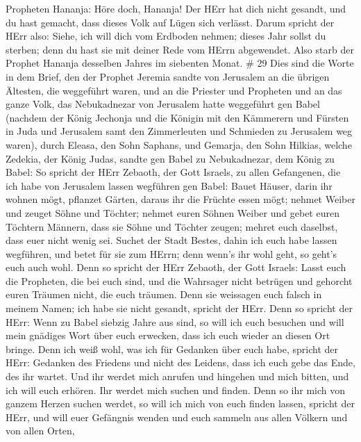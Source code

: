 Propheten Hananja: Höre doch, Hananja! Der HErr hat dich nicht gesandt,
und du hast gemacht, dass dieses Volk auf Lügen sich verlässt.
 Darum spricht der HErr also: Siehe, ich will dich vom
Erdboden nehmen; dieses Jahr sollst du sterben; denn du hast sie mit
deiner Rede vom HErrn abgewendet.  Also starb der Prophet
Hananja desselben Jahres im siebenten Monat. \# 29  Dies
sind die Worte in dem Brief, den der Prophet Jeremia sandte von
Jerusalem an die übrigen Ältesten, die weggeführt waren, und an die
Priester und Propheten und an das ganze Volk, das Nebukadnezar von
Jerusalem hatte weggeführt gen Babel  (nachdem der König
Jechonja und die Königin mit den Kämmerern und Fürsten in Juda und
Jerusalem samt den Zimmerleuten und Schmieden zu Jerusalem weg waren),
 durch Eleasa, den Sohn Saphans, und Gemarja, den Sohn
Hilkias, welche Zedekia, der König Judas, sandte gen Babel zu
Nebukadnezar, dem König zu Babel:  So spricht der HErr
Zebaoth, der Gott Israels, zu allen Gefangenen, die ich habe von
Jerusalem lassen wegführen gen Babel:  Bauet Häuser, darin
ihr wohnen mögt, pflanzet Gärten, daraus ihr die Früchte essen mögt;
 nehmet Weiber und zeuget Söhne und Töchter; nehmet euren
Söhnen Weiber und gebet euren Töchtern Männern, dass sie Söhne und
Töchter zeugen; mehret euch daselbst, dass euer nicht wenig sei.
 Suchet der Stadt Bestes, dahin ich euch habe lassen
wegführen, und betet für sie zum HErrn; denn wenn's ihr wohl geht, so
geht's euch auch wohl.  Denn so spricht der HErr Zebaoth,
der Gott Israels: Lasst euch die Propheten, die bei euch sind, und die
Wahrsager nicht betrügen und gehorcht euren Träumen nicht, die euch
träumen.  Denn sie weissagen euch falsch in meinem Namen;
ich habe sie nicht gesandt, spricht der HErr.  Denn so
spricht der HErr: Wenn zu Babel siebzig Jahre aus sind, so will ich euch
besuchen und will mein gnädiges Wort über euch erwecken, dass ich euch
wieder an diesen Ort bringe.  Denn ich weiß wohl, was ich
für Gedanken über euch habe, spricht der HErr: Gedanken des Friedens und
nicht des Leidens, dass ich euch gebe das Ende, des ihr wartet.
 Und ihr werdet mich anrufen und hingehen und mich bitten,
und ich will euch erhören.  Ihr werdet mich suchen und
finden. Denn so ihr mich von ganzem Herzen suchen werdet, 
so will ich mich von euch finden lassen, spricht der HErr, und will euer
Gefängnis wenden und euch sammeln aus allen Völkern und von allen Orten,
